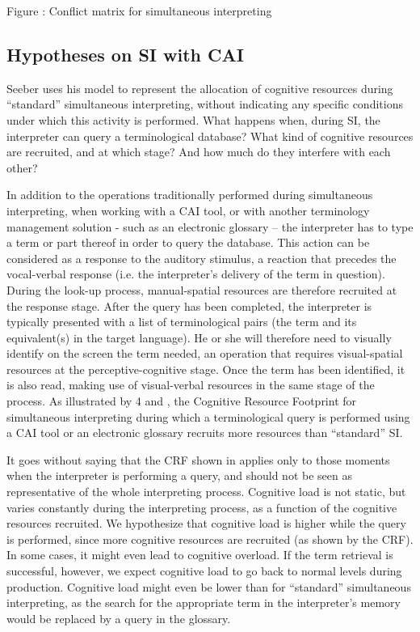 \documentclass[output=paper]{langsci/langscibook}
\begin{document}
\begin{styleFramecontents}
Figure : Conflict matrix for simultaneous interpreting \citep[1385]{Seeber2007}
\end{styleFramecontents}

\subsection{Hypotheses on SI with CAI}


Seeber uses his model to represent the allocation of cognitive resources during “standard” simultaneous interpreting, without indicating any specific conditions under which this activity is performed. What happens when, during SI, the interpreter can query a terminological database? What kind of cognitive resources are recruited, and at which stage? And how much do they interfere with each other?

In addition to the operations traditionally performed during simultaneous interpreting, when working with a CAI tool, or with another terminology management solution - such as an electronic glossary – the interpreter has to type a term or part thereof in order to query the database. This action can be considered as a response to the auditory stimulus, a reaction that precedes the vocal-verbal response (i.e. the interpreter’s delivery of the term in question). During the look-up process, manual-spatial resources are therefore recruited at the response stage. After the query has been completed, the interpreter is typically presented with a list of terminological pairs (the term and its equivalent(s) in the target language). He or she will therefore need to visually identify on the screen the term needed, an operation that requires visual-spatial resources at the perceptive-cognitive stage. Once the term has been identified, it is also read, making use of visual-verbal resources in the same stage of the process. As illustrated by 4 and , the Cognitive Resource Footprint for simultaneous interpreting during which a terminological query is performed using a CAI tool or an electronic glossary recruits more resources than “standard” SI. 

It goes without saying that the CRF shown in  applies only to those moments when the interpreter is performing a query, and should not be seen as representative of the whole interpreting process. Cognitive load is not static, but varies constantly during the interpreting process, as a function of the cognitive resources recruited. We hypothesize that cognitive load is higher while the query is performed, since more cognitive resources are recruited (as shown by the CRF). In some cases, it might even lead to cognitive overload. If the term retrieval is successful, however, we expect cognitive load to go back to normal levels during production. Cognitive load might even be lower than for “standard” simultaneous interpreting, as the search for the appropriate term in the interpreter’s memory would be replaced by a query in the glossary.
\end{document}
